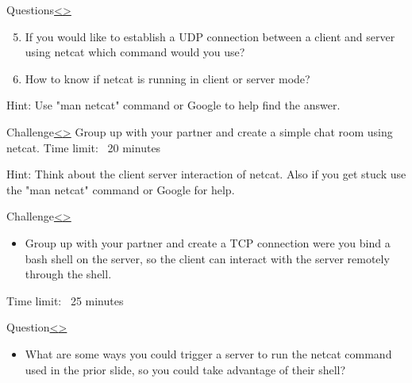 \documentclass[12pt]{article}
\newenvironment{instructionblock}{\Large\bgroup}{\egroup}
\begin{document}
\pagebreak
\begin{slide}{Questions}{\hyperref[slide 21]{\textless}\hyperref[slide 23]{\textgreater}}
   \vskip 5pt
   \begin{instructionblock}
   \begin{enumerate}
      \setcounter{enumi}{4}
      \item If you would like to establish a UDP connection between a client and server using netcat which command would you use?
      \item How to know if netcat is running in client or server mode?
   \end{enumerate}
   
   \end{instructionblock}
\end{slide}
Hint: Use "man netcat" command or Google to help find the answer.

\pagebreak
\begin{slide}{Challenge}{\hyperref[slide 22]{\textless}\hyperref[slide 24]{\textgreater}}
   \begin{instructionblock}
Group up with your partner and create a simple chat room using netcat. 
   \end{instructionblock}
    \newline\newline
    Time limit: ~20 minutes
\end{slide}
Hint: Think about the client server interaction of netcat. Also if you get stuck use the "man netcat" command or Google for help.

\pagebreak
\begin{slide}{Challenge}{\hyperref[slide 23]{\textless}\hyperref[slide 25]{\textgreater}}
   \begin{instructionblock}
      \begin{itemize}
         \item Group up with your partner and create a TCP connection were you bind a bash shell on the server, so the client can interact with the server remotely through the shell.
      \end{itemize}
   \end{instructionblock}
    Time limit: ~25 minutes
\end{slide}

\pagebreak
\begin{slide}{Question}{\hyperref[slide 24]{\textless}\hyperref[slide 26]{\textgreater}}
   \begin{instructionblock}
      \begin{itemize}
         \item What are some ways you could trigger a server to run the netcat command used in the prior slide, so you could take advantage of their shell?
      \end{itemize}
   \end{instructionblock}
\end{slide}
\end{document}
